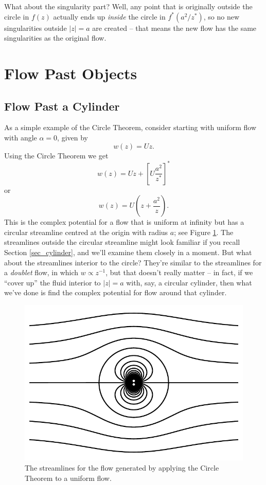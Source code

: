What about the singularity part?  Well, any point that is originally outside the circle in $f(z)$ actually ends up \emph{inside} the circle in $f^*(a^2/z^*)$, so no new singularities outside $|z| = a$ are created -- that means the new flow has the same singularities as the original flow.

%
%

\section{Flow Past Objects}




\subsection{Flow Past a Cylinder}

As a simple example of the Circle Theorem, consider starting with uniform flow with angle $\alpha = 0$, given by
\[
w(z) = Uz.
\]
Using the Circle Theorem we get
\[
w(z) = Uz + \left[ U \frac{a^2}{z^*} \right]^*
\]
or
\begin{equation}
w(z) = U \left( z + \frac{a^2}{z} \right).
\end{equation}
This is the complex potential for a flow that is uniform at infinity but has a circular streamline centred at the origin with radius $a$; see Figure \ref{fig_uniform_circle}. The streamlines outside the circular streamline might look familiar if you recall Section \ref{sec_cylinder}, and we'll examine them closely in a moment.  But what about the streamlines interior to the circle?  They're similar to the streamlines for a \emph{doublet} flow, in which $w \propto z^{-1}$, but that doesn't really matter -- in fact, if we ``cover up'' the fluid interior to $|z| = a$ with, say, a circular cylinder, then what we've done is find the complex potential for flow around that cylinder.

\begin{figure}
\centering\includegraphics[width=0.7\linewidth]{Figures/Chapter4/fig_uniform_circle}
\caption{The streamlines for the flow generated by applying the Circle Theorem to a uniform flow.}
\label{fig_uniform_circle}
\end{figure}

